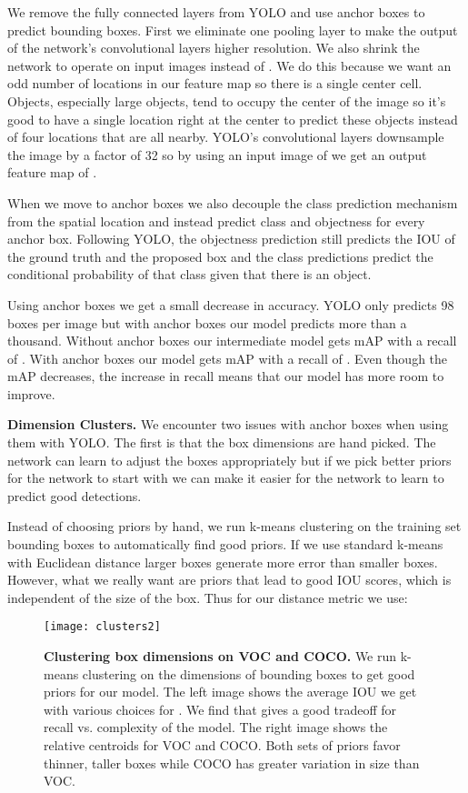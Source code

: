 \documentclass[10pt,twocolumn,letterpaper]{article}
\begin{document}
We remove the fully connected layers from YOLO and use anchor boxes to predict bounding boxes. First we eliminate one pooling layer to make the output of the network's convolutional layers higher resolution. We also shrink the network to operate on  input images instead of . We do this because we want an odd number of locations in our feature map so there is a single center cell. Objects, especially large objects, tend to occupy the center of the image so it's good to have a single location right at the center to predict these objects instead of four locations that are all nearby. YOLO's convolutional layers downsample the image by a factor of 32 so by using an input image of  we get an output feature map of .

When we move to anchor boxes we also decouple the class prediction mechanism from the spatial location and instead predict class and objectness for every anchor box. Following YOLO, the objectness prediction still predicts the IOU of the ground truth and the proposed box and the class predictions predict the conditional probability of that class given that there is an object.

Using anchor boxes we get a small decrease in accuracy. YOLO only predicts 98 boxes per image but with anchor boxes our model predicts more than a thousand. Without anchor boxes our intermediate model gets  mAP with a recall of . With anchor boxes our model gets  mAP with a recall of . Even though the mAP decreases, the increase in recall means that our model has more room to improve.

   
\textbf{Dimension Clusters.} We encounter two issues with anchor boxes when using them with YOLO. The first is that the box dimensions are hand picked. The network can learn to adjust the boxes appropriately but if we pick better priors for the network to start with we can make it easier for the network to learn to predict good detections.

Instead of choosing priors by hand, we run k-means clustering on the training set bounding boxes to automatically find good priors. If we use standard k-means with Euclidean distance larger boxes generate more error than smaller boxes. However, what we really want are priors that lead to good IOU scores, which is independent of the size of the box. Thus for our distance metric we use:




\begin{figure}[t]
      \centering
        \texttt{[image: clusters2]}
      \caption{\small \textbf{Clustering box dimensions on VOC and COCO.} We run k-means clustering on the dimensions of bounding boxes to get good priors for our model. The left image shows the average IOU we get with various choices for . We find that  gives a good tradeoff for recall vs. complexity of the model. The right image shows the relative centroids for VOC and COCO. Both sets of priors favor thinner, taller boxes while COCO has greater variation in size than VOC. }
      \label{cluster}
   \end{figure}
   
\end{document}
